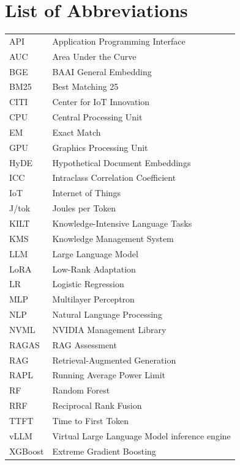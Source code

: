 \cleardoublepage
\section*{List of Abbreviations}

\noindent
\begin{tabular}{@{} l @{\hspace{2em}} l @{}}
API     & Application Programming Interface \\
AUC     & Area Under the Curve \\
BGE     & BAAI General Embedding \\
BM25    & Best Matching 25 \\
CITI    & Center for IoT Innovation \\
CPU     & Central Processing Unit \\
EM      & Exact Match \\
GPU     & Graphics Processing Unit \\
HyDE    & Hypothetical Document Embeddings \\
ICC     & Intraclass Correlation Coefficient \\
IoT     & Internet of Things \\
J/tok   & Joules per Token \\
KILT    & Knowledge-Intensive Language Tasks \\
KMS     & Knowledge Management System \\
LLM     & Large Language Model \\
LoRA    & Low-Rank Adaptation \\
LR      & Logistic Regression \\
MLP     & Multilayer Perceptron \\
NLP     & Natural Language Processing \\
NVML    & NVIDIA Management Library \\
RAGAS   & RAG Assessment \\
RAG     & Retrieval-Augmented Generation \\
RAPL    & Running Average Power Limit \\
RF      & Random Forest \\
RRF     & Reciprocal Rank Fusion \\
TTFT    & Time to First Token \\
vLLM    & Virtual Large Language Model inference engine \\
XGBoost & Extreme Gradient Boosting \\
\end{tabular}

